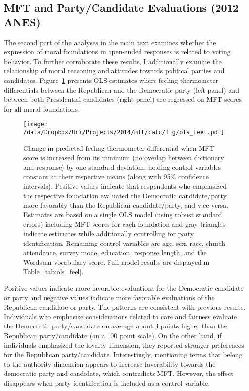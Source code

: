 \clearpage
\subsection{MFT and Party/Candidate Evaluations (2012 ANES)}\label{app:candeval}

The second part of the analyses in the main text examines whether the expression of moral foundations in open-ended responses is related to voting behavior. To further corroborate these results, I additionally examine the relationship of moral reasoning and attitudes towards political parties and candidates. Figure~\ref{fig:ols_feel} presents OLS estimates where feeling thermometer differentials between the Republican and the Democratic party (left panel) and between both Presidential candidates (right panel) are regressed on MFT scores for all moral foundations. 


\begin{figure}[ht]\centering
\texttt{[image: /data/Dropbox/Uni/Projects/2014/mft/calc/fig/ols\_feel.pdf]}
\caption[Effect of MFT score on predicted feeling thermometer differential]{Change in predicted feeling thermometer differential when MFT score is increased from its minimum (no overlap between dictionary and response) by one standard deviation, holding control variables constant at their respective means (along with 95\% confidence intervals). Positive values indicate that respondents who emphasized the respective foundation evaluated the Democratic candidate/party more favorably than the Republican candidate/party, and vice versa. Estimates are based on a single OLS model (using robust standard errors) including MFT scores for each foundation and gray triangles indicate estimates while additionally controlling for party identification. Remaining control variables are age, sex, race, church attendance, survey mode, education, response length, and the Wordsum vocabulary score. Full model results are displayed in Table~\ref{tab:ols_feel}.
}\label{fig:ols_feel}
\end{figure}

Positive values indicate more favorable evaluations for the Democratic candidate or party and negative values indicate more favorable evaluations of the Republican candidate or party. The patterns are consistent with previous results. Individuals who emphasize considerations related to care and fairness evaluate the Democratic party/candidate on average about 3 points higher than the Republican party/candidate (on a 100 point scale). On the other hand, if individuals emphasized the loyalty dimension, they reported stronger preferences for the Republican party/candidate. Interestingly, mentioning terms that belong to the authority dimension appears to increase favorability towards the democratic party and candidate, which contradicts MFT. However, the effect disappears when party identification is included as a control variable.


